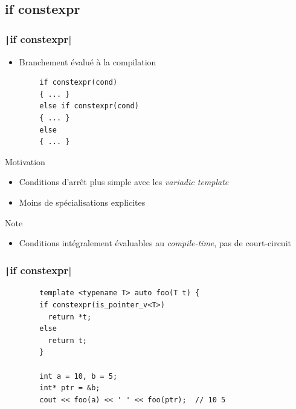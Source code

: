 \documentclass[C++.tex]{subfiles}
\begin{document}
\subsection*{if constexpr}
\begin{frame}[fragile]
	\frametitle{\texttt|if constexpr|}
	\begin{itemize}
		\item Branchement évalué à la compilation
	\end{itemize}

	\begin{verbatim}
		if constexpr(cond)
		{ ... }
		else if constexpr(cond)
		{ ... }
		else
		{ ... }
	\end{verbatim}

	\begin{block}{Motivation}
		\begin{itemize}
			\item Conditions d'arrêt plus simple avec les \textit{variadic template}
			\item Moins de spécialisations explicites
		\end{itemize}
	\end{block}

	\begin{block}{Note}
		\begin{itemize}
			\item Conditions intégralement évaluables au \textit{compile-time}, pas de court-circuit
		\end{itemize}

	\end{block}
\end{frame}

\begin{frame}[fragile]
	\frametitle{\texttt|if constexpr|}
	\begin{verbatim}
		template <typename T> auto foo(T t) {
		if constexpr(is_pointer_v<T>)
		  return *t;
		else
		  return t;
		}
		
		int a = 10, b = 5;
		int* ptr = &b;
		cout << foo(a) << ' ' << foo(ptr);  // 10 5
	\end{verbatim}
\end{frame}
\end{document}
